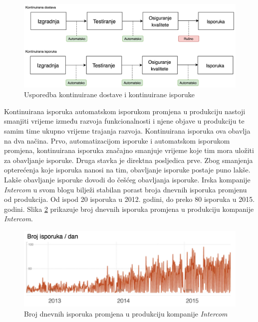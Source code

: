 \documentclass[times, utf8, diplomski, numeric]{fer}
\begin{document}
\begin{figure}
\centering
\includegraphics[scale=0.55]{CDDifferences}
\caption{Usporedba kontinuirane dostave i kontinuirane isporuke}
\label{fig:CDDifferences}
\end{figure}

Kontinuirana isporuka automatskom isporukom promjena u produkciju nastoji smanjiti vrijeme između razvoja funkcionalnosti i njene objave u produkciju te samim time ukupno vrijeme trajanja razvoja. Kontinuirana isporuka ova obavlja na dva načina. Prvo, automatizacijom isporuke i automatskom isporukom promjena, kontinuirana isporuka značajno smanjuje vrijeme koje tim mora uložiti za obavljanje isporuke. Druga stavka je direktna posljedica prve. Zbog smanjenja opterećenja koje isporuka nanosi na tim, obavljanje isporuke postaje puno lakše. Lakše obavljanje isporuke dovodi do češćeg obavljanja isporuke. Irska kompanije \textit{Intercom} u svom blogu bilježi stabilan porast broja dnevnih isporuka promjenu od produkcija. Od ispod 20 isporuka u 2012. godini, do preko 80 isporuka u 2015. godini. Slika \ref{fig:IntercomShipsPerDay} prikazuje broj dnevnih isporuka promjena u produkciju kompanije \textit{Intercom}\citep{intercom:cd}.

\begin{figure}
\centering
\includegraphics[scale=0.7]{IntercomShipsPerDay}
\caption{Broj dnevnih isporuka promjena u produkciju kompanije \textit{Intercom}}
\label{fig:IntercomShipsPerDay}
\end{figure}
\end{document}
